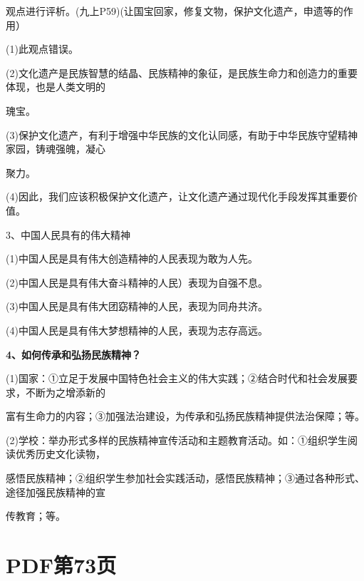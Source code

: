 \documentclass[lang=cn,11pt]{elegantbook}
\newcommand{\daofasym}[1]{{\daofasymbolfont #1}}
\newcommand{\daofasym}[1]{#1}
\begin{document}
观点进行评析。(九上P59)(让国宝回家，修复文物，保护文化遗产，申遗等的作用）\par

(1)此观点错误。\par

(2)文化遗产是民族智慧的结晶、民族精神的象征，是民族生命力和创造力的重要体现，也是人类文明的\par

瑰宝。\par

(3)保护文化遗产，有利于增强中华民族的文化认同感，有助于中华民族守望精神家园，铸魂强魄，凝心\par

聚力。\par

(4)因此，我们应该积极保护文化遗产，让文化遗产通过现代化手段发挥其重要价值。\par

3、中国人民具有的伟大精神\par

(1)中国人民是具有伟大创造精神的人民表现为敢为人先。\par

(2)中国人民是具有伟大奋斗精神的人民）表现为自强不息。\par

(3)中国人民是具有伟大团窈精神的人民，表现为同舟共济。\par

(4)中国人民是具有伟大梦想精神的人民，表现为志存高远。\par

\textbf{4、如何传承和弘扬民族精神？}\par

(1)国家：\daofasym{①}立足于发展中国特色社会主义的伟大实践；\daofasym{②}结合时代和社会发展要求，不断为之增添新的\par

富有生命力的内容；\daofasym{③}加强法治建设，为传承和弘扬民族精神提供法治保障；等。\par

(2)学校：举办形式多样的民族精神宣传活动和主题教育活动。如：\daofasym{①}组织学生阅读优秀历史文化读物，\par

感悟民族精神；\daofasym{②}组织学生参加社会实践活动，感悟民族精神；\daofasym{③}通过各种形式、途径加强民族精神的宣\par

传教育；等。\par


\section*{PDF第73页}
\end{document}
